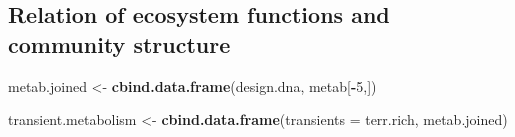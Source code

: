 \documentclass[]{article}
\newenvironment{Shaded}{\begin{snugshade}}{\end{snugshade}}
\newcommand{\DataTypeTok}[1]{\textcolor[rgb]{0.13,0.29,0.53}{#1}}
\newcommand{\DecValTok}[1]{\textcolor[rgb]{0.00,0.00,0.81}{#1}}
\newcommand{\KeywordTok}[1]{\textcolor[rgb]{0.13,0.29,0.53}{\textbf{#1}}}
\newcommand{\NormalTok}[1]{#1}
\newcommand{\OperatorTok}[1]{\textcolor[rgb]{0.81,0.36,0.00}{\textbf{#1}}}
\newcommand{\StringTok}[1]{\textcolor[rgb]{0.31,0.60,0.02}{#1}}
\begin{document}
\hypertarget{relation-of-ecosystem-functions-and-community-structure}{%
\subsection{Relation of ecosystem functions and community
structure}\label{relation-of-ecosystem-functions-and-community-structure}}

\begin{Shaded}
\begin{Highlighting}[]
\NormalTok{metab.joined <-}\StringTok{ }\KeywordTok{cbind.data.frame}\NormalTok{(design.dna, metab[}\OperatorTok{-}\DecValTok{5}\NormalTok{,])}

\NormalTok{transient.metabolism <-}\StringTok{ }\KeywordTok{cbind.data.frame}\NormalTok{(}\DataTypeTok{transients =}\NormalTok{ terr.rich, metab.joined) }


\end{Highlighting}
\end{Shaded}
\end{document}
